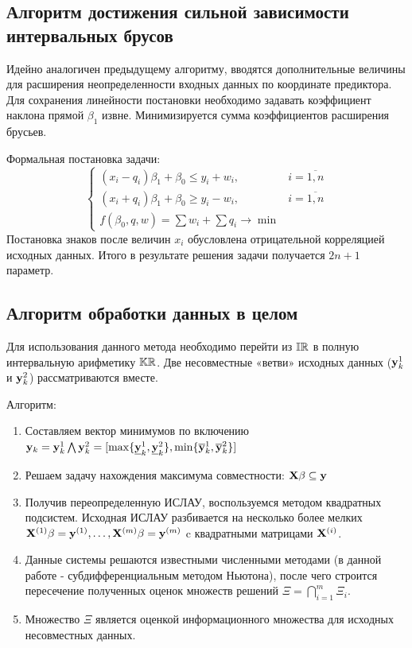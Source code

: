 \documentclass[a4paper]{article}
\begin{document}
\subsection{Алгоритм достижения сильной зависимости интервальных брусов}
Идейно аналогичен предыдущему алгоритму, вводятся дополнительные величины для расширения неопределенности входных данных по координате предиктора. Для сохранения линейности постановки необходимо задавать коэффициент наклона прямой $\beta_1$ извне. Минимизируется сумма коэффициентов расширения брусьев. 

Формальная постановка задачи:
\begin{equation}\label{alg2}
\begin{cases}
        (x_i-q_i)\beta_1+\beta_0\leq y_i + w_i,& i=\overline{1,n}\\
        (x_i+q_i)\beta_1+\beta_0\geq y_i - w_i,& i=\overline{1,n}\\
        f(\beta_0,q,w)=\sum w_i+\sum q_i\rightarrow \min
\end{cases}
\end{equation}
Постановка знаков после величин $x_i$ обусловлена отрицательной корреляцией исходных данных. Итого в результате решения задачи получается $2n+1$ параметр.
\subsection{Алгоритм обработки данных в целом}
Для использования данного метода необходимо перейти из $\mathbb{IR}$ в полную интервальную арифметику $\mathbb{KR}$. Две несовместные «ветви» исходных данных ($\mathbf{y}_k^1$ и $\mathbf{y}_k^2$) рассматриваются вместе.

Алгоритм:
\begin{enumerate}
    \item Составляем вектор минимумов по включению $\mathbf{y}_k=\mathbf{y}_k^1\bigwedge\mathbf{y}_k^2=[\max\{\underline{\mathbf{y}}_k^1,\underline{\mathbf{y}}_k^2\}, \min\{\overline{\mathbf{y}}_k^1,\overline{\mathbf{y}}_k^2\}]$
    \item Решаем задачу нахождения максимума совместности: $\mathbf{X}\beta\subseteq\mathbf{y}$
    \item Получив переопределенную ИСЛАУ, воспользуемся методом квадратных подсистем. Исходная ИСЛАУ разбивается на несколько более мелких $\mathbf{X}^{(1)}\beta=\mathbf{y}^{(1)},\dots,\mathbf{X}^{(m)}\beta=\mathbf{y}^{(m)}$ c квадратными матрицами $\mathbf{X}^{(i)}$. 
    \item Данные системы решаются известными численными методами (в данной работе - субдифференциальным методом Ньютона), после чего строится пересечение полученных оценок множеств решений $\Xi=\bigcap_{i=1}^m\Xi_i$.
    \item Множество $\Xi$ является оценкой информационного множества для исходных несовместных данных.
\end{enumerate}
\end{document}
